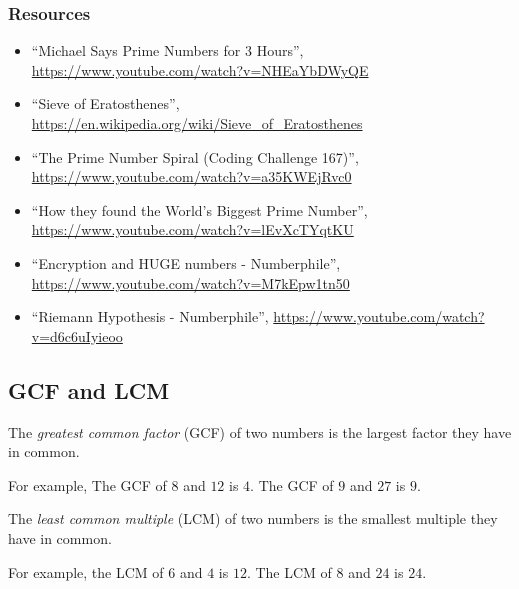 \subsubsection{Resources}
\begin{itemize}
	\item {\footnotesize ``Michael Says Prime Numbers for 3 Hours'', \url{https://www.youtube.com/watch?v=NHEaYbDWyQE}}
	\item {\footnotesize ``Sieve of Eratosthenes'', \url{https://en.wikipedia.org/wiki/Sieve_of_Eratosthenes}}
	\item {\footnotesize ``The Prime Number Spiral (Coding Challenge 167)'', \url{https://www.youtube.com/watch?v=a35KWEjRvc0}}
	\item {\footnotesize ``How they found the World's Biggest Prime Number'', \url{https://www.youtube.com/watch?v=lEvXcTYqtKU}}
	\item {\footnotesize ``Encryption and HUGE numbers - Numberphile'', \url{https://www.youtube.com/watch?v=M7kEpw1tn50}}
	\item {\footnotesize ``Riemann Hypothesis - Numberphile'', \url{https://www.youtube.com/watch?v=d6c6uIyieoo}}
\end{itemize}

\newpage 
\subsection{GCF and LCM}

\begin{definition} 
The \emph{greatest common factor} (GCF) of two numbers is the largest factor they have in common.  

For example, The GCF of \(8\) and \(12\) is \(4\). The GCF of \(9\) and \(27\) is \(9\).  
\end{definition}


\begin{definition} 
The \emph{least common multiple} (LCM) of two numbers is the smallest multiple they have in common.  

For example, the LCM of \(6\) and \(4\) is \(12\).  The LCM of \(8\) and \(24\) is \(24\).   
\end{definition}


\newpage 
